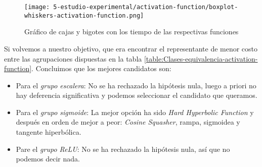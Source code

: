 \begin{table}[H]
    \centering
    \caption{Tiempo de ejecución en segundos}
    \label{Tiempos-ejecucion-comparativas}
\end{table}

\begin{figure}[H]
    \centering
     \texttt{[image: 5-estudio-experimental/activation-function/boxplot-whiskers-activation-function.png]}
     \caption{Gráfico de cajas y bigotes con los tiempo de las respectivas funciones}
     \label{img:boxplot-whiskers-activation-function}
\end{figure} 

Si volvemos a nuestro objetivo, que era encontrar el representante de 
menor costo entre las agrupaciones dispuestas en la tabla \ref{table:Clases-equivalencia-activation-function}. Concluimos que los mejores candidatos son: 

\begin{itemize}
    \item Para el \textit{grupo escalera}: No se ha rechazado la hipótesis nula, luego a priori no hay deferencia significativa y podemos seleccionar el candidato que queramos. 
    \item Para el \textit{grupo sigmoide}: La mejor opción ha sido \textit{Hard Hyperbolic Function} y  después en orden de mejor a peor: \textit{Cosine Squasher}, rampa, sigmoidea y tangente hiperbólica.
    \item Pare el \textit{grupo ReLU}: No se ha rechazado la hipótesis nula, así que no podemos decir nada. 
\end{itemize}

